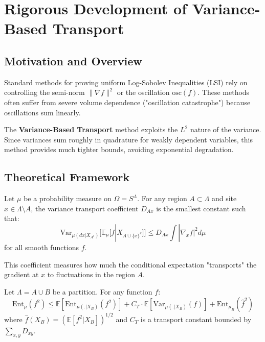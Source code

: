 \section{Rigorous Development of Variance-Based Transport}
\label{sec:variance_transport_rigorous}


\subsection{Motivation and Overview}

Standard methods for proving uniform Log-Sobolev Inequalities (LSI) rely on controlling the semi-norm $\| \nabla f \|^2$ or the oscillation $\text{osc}(f)$. These methods often suffer from severe volume dependence ("oscillation catastrophe") because oscillations sum linearly.

The \textbf{Variance-Based Transport} method exploits the $L^2$ nature of the variance. Since variances sum roughly in quadrature for weakly dependent variables, this method provides much tighter bounds, avoiding exponential degradation.

\subsection{Theoretical Framework}

\begin{definition}
Let $\mu$ be a probability measure on $\Omega = S^\Lambda$. For any region $A \subset \Lambda$ and site $x \in \Lambda \setminus A$, the variance transport coefficient $D_{Ax}$ is the smallest constant such that:
\begin{equation}
\text{Var}_{\mu(dx|X_{A^c})} [ \mathbb{E}_\mu [f | X_{A \cup \{x\}^c}] ] \leq D_{Ax} \int |\nabla_x f|^2 d\mu
\end{equation}
for all smooth functions $f$.
\end{definition}

This coefficient measures how much the conditional expectation "transports" the gradient at $x$ to fluctuations in the region $A$.

\begin{theorem}
\label{thm:variance_decomposition}
Let $\Lambda = A \cup B$ be a partition. For any function $f$:
\begin{equation}
\text{Ent}_\mu(f^2) \leq \mathbb{E}[\text{Ent}_{\mu(.|X_B)}(f^2)] + C_T \cdot \mathbb{E}[\text{Var}_{\mu(.|X_B)}(f)] + \text{Ent}_{\mu_B}(\hat{f}^2)
\end{equation}
where $\hat{f}(X_B) = (\mathbb{E}[f^2 | X_B])^{1/2}$ and $C_T$ is a transport constant bounded by $\sum_{x,y} D_{xy}$.
\end{theorem}

